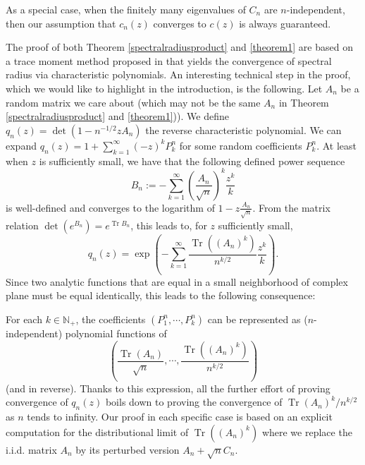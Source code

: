 \documentclass[12pt, reqno]{amsart}
\theoremstyle{definition}
\theoremstyle{remark}
\numberwithin{equation}{section}
\begin{document}
As a special case, when the finitely many eigenvalues of $C_n$ are $n$-independent, then our assumption that $c_n(z)$ converges to $c(z)$ is always guaranteed. 


The proof of both Theorem \ref{spectralradiusproduct} and \ref{theorem1} are based on a trace moment method proposed in \cite{bordenave2021convergence} that yields the convergence of spectral radius via characteristic polynomials. An interesting technical step in the proof, which we would like to highlight in the introduction, is the following. Let $A_n$ be a random matrix we care about (which may not be the same $A_n$ in Theorem \ref{spectralradiusproduct} and \ref{theorem1})). We define $q_n(z)=\det(1-n^{-1/2}zA_n)$ the reverse characteristic polynomial. We can expand $q_n(z)=1+\sum_{k=1}^\infty(-z)^kP_k^n$ for some random coefficients $P_k^n$. At least when $z$ is sufficiently small, we have that the following defined power sequence 
$$B_n:=-\sum_{k=1}^\infty (\frac{A_n}{\sqrt{n}})^k\frac{z^k}{k}$$
is well-defined and converges to the logarithm of $1-z\frac{A_n}{\sqrt{n}}.$ From the matrix relation $\det(e^{B_n})=e^{\operatorname{Tr}B_n}$, this leads to, for $z$ sufficiently small, 
$$
q_n(z)=\exp\left(-\sum_{k=1}^\infty \frac{\operatorname{Tr}((A_n)^k)}{n^{k/2}}\frac{z^k}{k}
\right).
$$ Since two analytic functions that are equal in a small neighborhood of complex plane must be equal identically, this leads to the following consequence:

For each $k\in\mathbb{N}_+$, the coefficients $(P_1^n,\cdots,P_k^n)$ can be represented as ($n$-independent) polynomial functions of $$\left(\frac{\operatorname{Tr}(A_n)}{\sqrt{n}},\cdots,\frac{\operatorname{Tr}((A_n)^k)}{n^{k/2}}\right)$$ (and in reverse). Thanks to this expression, all the further effort of proving convergence of $q_n(z)$ boils down to proving the convergence of $\operatorname{Tr}(A_n)^k/n^{k/2}$ as $n$ tends to infinity. Our proof in each specific case is based on an explicit computation for the distributional limit of $\operatorname{Tr}((A_n)^k)$ where we replace the i.i.d. matrix $A_n$ by its perturbed version $A_n+\sqrt{n}C_n$.
\end{document}
